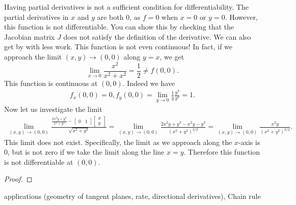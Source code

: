 Having partial derivatives is not a sufficient condition for differentiability.
The partial derivatives in $x$ and $y$ are both $0$, as $f=0$ when $x=0$ or $y=0$. However, this function is not differentiable. You can show this by checking that the Jacobian matrix $J$ does not satisfy the definition of the derivative. We can also get by with less work. This function is not even continuous! In fact, if we approach the limit $(x,y)\to(0,0)$ along $y=x$,
we get \[
\lim_{x\to 0 }\frac{x^2}{x^2+x^2} = \frac{1}{2}\neq f(0,0).
\]
This function is continuous at $(0,0)$. Indeed we have \begin{align*}
    f_x(0,0) = 0, f_y(0,0)= \lim_{y\to 0 } \frac{1}{y}\frac{y^3}{y^2}=1.
\end{align*}
Now let us investigate the limit \begin{align*}
    \lim_{(x,y)\to(0,0)}\frac{\frac{2x^2y+y^3}{x^2+y^2} - \begin{bmatrix}
        0&1
    \end{bmatrix}\begin{bmatrix}
        x\\y
    \end{bmatrix}}{\sqrt{x^2+y^2}}
    =\lim_{(x,y)\to(0,0)}\frac{2x^2y+y^3-x^2y-y^3}{(x^2+y^2)^{3/2}}=
    \lim_{(x,y)\to(0,0)}\frac{x^2y}{(x^2+y^2)^{3/2}}.
\end{align*}
This limit does not exist. Specifically, the limit as we approach along the $x$-axis is $0$, but is not zero if we take the limit along the line $x=y$. Therefore this function is not differentiable at $(0,0)$.

\begin{proof}
    \todo
\end{proof}
\todo applications (geometry of tangent planes, rate, directional derivatives), Chain rule